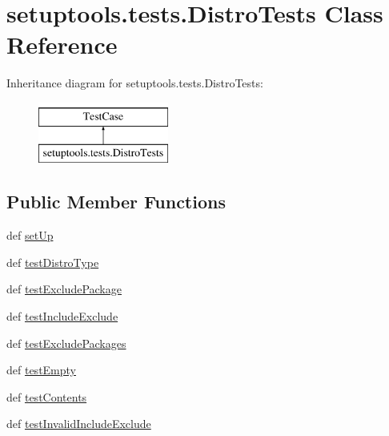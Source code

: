 \hypertarget{classsetuptools_1_1tests_1_1DistroTests}{}\section{setuptools.\+tests.\+Distro\+Tests Class Reference}
\label{classsetuptools_1_1tests_1_1DistroTests}
Inheritance diagram for setuptools.\+tests.\+Distro\+Tests\+:\begin{figure}[H]
\begin{center}
\leavevmode
\includegraphics[height=2.000000cm]{classsetuptools_1_1tests_1_1DistroTests}
\end{center}
\end{figure}
\subsection*{Public Member Functions}
\begin{DoxyCompactItemize}
\item 
def \hyperlink{classsetuptools_1_1tests_1_1DistroTests_aa211c479cecd26085d2b5863f36a8597}{set\+Up}
\item 
def \hyperlink{classsetuptools_1_1tests_1_1DistroTests_a36dafd5d4282a8836535afea9e29fc3f}{test\+Distro\+Type}
\item 
def \hyperlink{classsetuptools_1_1tests_1_1DistroTests_a1368d84979f70460219ac37fcc6eed16}{test\+Exclude\+Package}
\item 
def \hyperlink{classsetuptools_1_1tests_1_1DistroTests_a2b1f66cc3179adac5d82bb49527beee9}{test\+Include\+Exclude}
\item 
def \hyperlink{classsetuptools_1_1tests_1_1DistroTests_ad08583e6150bf5169387674cd56c1fdf}{test\+Exclude\+Packages}
\item 
def \hyperlink{classsetuptools_1_1tests_1_1DistroTests_a23a05fb9974817775748448096700fe4}{test\+Empty}
\item 
def \hyperlink{classsetuptools_1_1tests_1_1DistroTests_a6522ec4737b78a981af157ae19c4407d}{test\+Contents}
\item 
def \hyperlink{classsetuptools_1_1tests_1_1DistroTests_ab5aceb7894eb937c75c545eb76f7195e}{test\+Invalid\+Include\+Exclude}
\end{DoxyCompactItemize}
